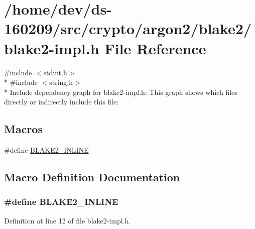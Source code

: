 \hypertarget{blake2-impl_8h}{}\section{/home/dev/ds-\/160209/src/crypto/argon2/blake2/blake2-\/impl.h File Reference}
\label{blake2-impl_8h}
{\ttfamily \#include $<$stdint.\+h$>$}\\*
{\ttfamily \#include $<$string.\+h$>$}\\*
Include dependency graph for blake2-\/impl.h\+:
This graph shows which files directly or indirectly include this file\+:
\subsection*{Macros}
\begin{DoxyCompactItemize}
\item 
\#define \hyperlink{blake2-impl_8h_aa47358e2e39f403db8cddffec65337f7}{B\+L\+A\+K\+E2\+\_\+\+I\+N\+L\+I\+N\+E}
\end{DoxyCompactItemize}


\subsection{Macro Definition Documentation}
\hypertarget{blake2-impl_8h_aa47358e2e39f403db8cddffec65337f7}{}
\subsubsection[{B\+L\+A\+K\+E2\+\_\+\+I\+N\+L\+I\+N\+E}]{\setlength{\rightskip}{0pt plus 5cm}\#define B\+L\+A\+K\+E2\+\_\+\+I\+N\+L\+I\+N\+E}\label{blake2-impl_8h_aa47358e2e39f403db8cddffec65337f7}


Definition at line 12 of file blake2-\/impl.\+h.

